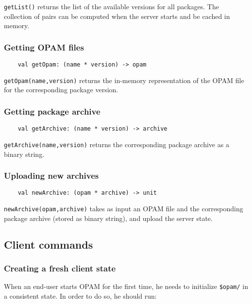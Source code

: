 \documentclass[a4paper,11pt]{article}
\begin{document}
{\tt getList()} returns the list of the available versions for all
packages. The collection of pairs can be computed when the server
starts and be cached in memory.

\subsubsection{Getting OPAM files}
\label{getOpam}

\begin{verbatim}
    val getOpam: (name * version) -> opam
\end{verbatim}

{\tt getOpam(name,version)} returns the in-memory representation of
the OPAM file for the corresponding package version.

\subsubsection{Getting package archive}
\label{getArchive}

\begin{verbatim}
    val getArchive: (name * version) -> archive
\end{verbatim}

{\tt getArchive(name,version)} returns the corresponding package
archive as a binary string.

\subsubsection{Uploading new archives}
\label{newArchive}

\begin{verbatim}
    val newArchive: (opam * archive) -> unit
\end{verbatim}

{\tt newArchive(opam,archive)} takes as input an OPAM file and the
corresponding package archive (stored as binary string), and upload
the server state.

\subsection{Client commands}

\subsubsection{Creating a fresh client state}

When an end-user starts OPAM for the first time, he needs to
initialize {\tt \$opam/} in a consistent state. In order to do so, he
should run:
\end{document}
